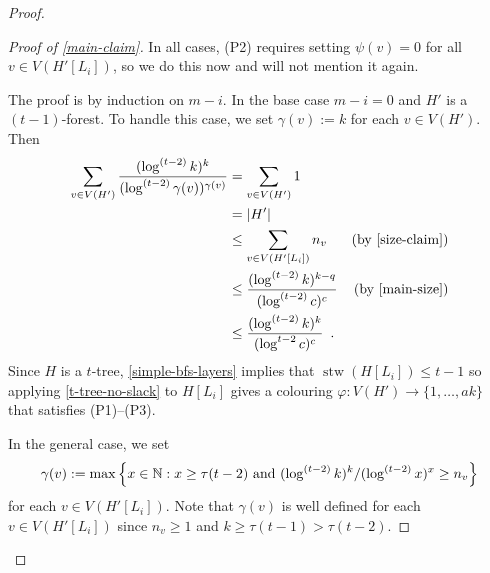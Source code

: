 \documentclass[kpfonts]{patmorin}
\DeclareMathOperator{\stw}{stw}
\theoremstyle{named}
\begin{document}
\begin{proof}
    \begin{proof}[Proof of \cref{main-claim}]
        In all cases, (P2) requires setting $\psi(v)=0$ for all $v\in V(H'[L_i])$, so we do this now and will not mention it again.

        The proof is by induction on $m-i$. In the base case $m-i=0$ and $H'$ is a $(t-1)$-forest.
        To handle this case, we set $\gamma(v):=k$ for each $v\in V(H')$.  Then
        \begin{align*}
            \sum_{v\in V(H')} \frac{(\log^{(t-2)} k)^k}{(\log^{(t-2)} \gamma(v))^{\gamma(v)}}
            & = \sum_{v\in V(H')} 1 \\
            & = |H'| \\
            & \le \sum_{v\in V(H'[L_i])} n_v  & \text{(by \cref{size-claim})}\\
            & \le \frac{(\log^{(t-2)} k)^{k-q}}{(\log^{(t-2)} c)^c} & \text{(by \cref{main-size})}\\
            & \le \frac{(\log^{(t-2)} k)^{k}}{(\log^{t-2} c)^c} \enspace .
        \end{align*}
        Since $H$ is a $t$-tree, \cref{simple-bfs-layers} implies that $\stw(H[L_i])\le t-1$ so applying \cref{t-tree-no-slack} to $H[L_i]$ gives a colouring $\varphi: V(H')\to\{1,\ldots,ak\}$ that satisfies (P1)--(P3).

        In the general case, we set
        \[
            \gamma(v):=\max\left\{x\in\mathbb{N}:\text{$x\ge\tau(t-2)$ and $(\log^{(t-2)} k)^k/(\log^{(t-2)} x)^x \ge n_v$}\right\}
        \]
        for each $v\in V(H'[L_i])$.  Note that $\gamma(v)$ is well defined for each $v\in V(H'[L_i])$ since $n_v\ge 1$ and $k\ge \tau(t-1)>\tau(t-2)$.


\end{proof}
\end{proof}
\end{document}
